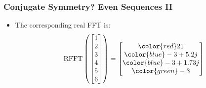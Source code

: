 \documentclass{beamer}
\begin{document}
\begin{frame}
\frametitle{Conjugate Symmetry? Even Sequences II}
\begin{itemize}
    \item The corresponding real FFT is:
        \begin{equation}
        \textrm{RFFT}\left(\begin{bmatrix}1 \\ 2 \\ 3 \\ 4 \\ 5 \\ 6 \end{bmatrix}\right) = 
        \begin{bmatrix}
           {\color{red}21} \\ {\color{blue}-3+5.2j} \\ {\color{blue}-3+1.73j} \\
           {\color{green}-3} 
        \end{bmatrix}
        \end{equation}
\end{itemize}
\end{frame}
\end{document}

